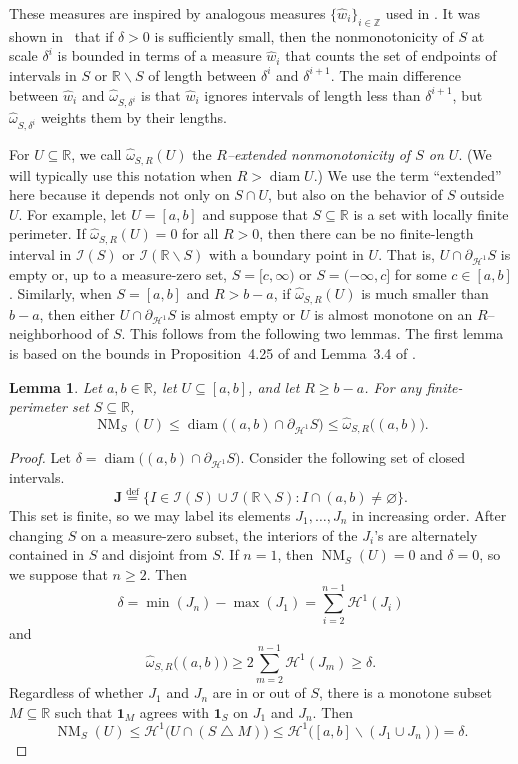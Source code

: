 \documentclass[11pt,reqno]{amsart}
\newcommand{\R}{\mathbb{R}}
\newcommand{\Z}{\mathbb{Z}}
\newcommand{\cH}{\mathcal{H}}
\newcommand{\cI}{\mathcal{I}}
\newcommand{\0}{\mathbf{0}}
\renewcommand{\1}{\mathbf 1}
\newcommand{\one}{\mathbf{1}}
\newcommand{\symdiff}{\mathbin{\triangle}}
\renewcommand{\mid}{:}
\renewcommand{\subset}{\subseteq}
\newcommand{\eqdef}{\stackrel{\mathrm{def}}{=}}
\renewcommand{\ge}{\geqslant}
\renewcommand{\le}{\leqslant}
\renewcommand{\setminus}{\smallsetminus}
\renewcommand{\emptyset}{\varnothing}
\newtheorem{lemma}[thm]{Lemma}
\theoremstyle{remark}
\newcommand{\bJ}{\mathbf{J}}
\DeclareMathOperator{\NM}{NM}
\DeclareMathOperator{\diam}{diam}
\begin{document}
These measures are inspired  by analogous measures $\{\widehat{w}_i\}_{i\in \Z}$ used in \cite{CKN}.  It was shown in~\cite{CKN} that if $\delta>0$ is sufficiently small, then the nonmonotonicity of $S$ at scale $\delta^i$ is bounded in terms of a measure $\widehat{w}_i$ that counts the set of endpoints of intervals in $S$ or $\R\setminus S$ of length between $\delta^i$ and $\delta^{i+1}$.  The main difference between $\widehat{w}_i$ and $\widehat{\omega}_{S,\delta^i}$ is that $\widehat{w}_i$ ignores intervals of length less than $\delta^{i+1}$, but $\widehat{\omega}_{S, \delta^i}$ weights them by their lengths.

For $U\subset \R$, we call $\widehat{\omega}_{S,R}(U)$ the \emph{$R$--extended nonmonotonicity of $S$ on $U$}.  (We will typically use this notation when $R>\diam U$.)  We use the term ``extended'' here because it depends not only on $S\cap U$, but also on the behavior of $S$ outside $U$.  For example, let $U=[a,b]$ and suppose that $S\subset \R$ is a set with locally finite perimeter.  If $\widehat{\omega}_{S,R}(U)=0$ for all $R>0$, then there can be no finite-length interval in $\cI(S)$ or $\cI(\R\setminus S)$ with a boundary point in $U$.  That is, $U\cap \partial_{\cH^1}S$ is empty or, up to a measure-zero set, $S=[c,\infty)$ or $S=(-\infty,c]$ for some $c\in [a,b]$. Similarly, when $S=[a,b]$ and $R > b-a$, if $\widehat{\omega}_{S ,R}(U)$ is much smaller than $b-a$, then either $U\cap \partial_{\cH^1} S$ is almost empty or $U$ is almost monotone on an $R$--neighborhood of $S$.  This follows from the following two lemmas.  The first lemma is based on the bounds in Proposition~4.25 of \cite{CKN} and Lemma~3.4 of \cite{FasslerOrponenRigot18}.
\begin{lemma}\label{lem:omega boundary diam NM}
  Let $a,b\in \R$, let $U \subset [a,b]$, and let $R\ge b-a$.  For any finite-perimeter set $S\subset \R$,
  $$\NM_{S}(U)\le \diam \big( (a,b)\cap \partial_{\cH^1} S\big) \le \widehat{\omega}_{S,R}\big((a,b)\big).$$
\end{lemma}
\begin{proof}
  Let $\delta=\diam \big( (a,b)\cap \partial_{\cH^1} S\big)$.  Consider the following set of closed intervals.
  $$\bJ\eqdef \{I\in \cI(S)\cup \cI(\R\setminus S)\mid I\cap (a,b)\ne \emptyset\}.$$
  This set is finite, so we may label its elements $J_1,\dots, J_n$ in increasing order.  After changing $S$ on a measure-zero subset, the interiors of the $J_i$'s are alternately contained in $S$ and disjoint from $S$.  If $n=1$, then $\NM_{S}(U)=0$ and $\delta=0$, so we suppose that $n\ge 2$.  Then
  $$\delta=\min(J_n)-\max(J_1)=\sum_{i=2}^{n-1} \cH^1(J_i)$$
  and
  $$\widehat{\omega}_{S,R}\big((a,b)\big)\ge 2 \sum_{m=2}^{n-1} \cH^1(J_m)\ge \delta.$$
Regardless of whether $J_1$ and $J_n$ are in or out of $S$, there is a monotone subset $M\subset \R$ such that $\one_M$ agrees with $\one_S$ on $J_1$ and $J_n$.  Then
 \begin{equation*}
 \NM_{S}(U)\le \cH^1\big(U\cap (S\symdiff M)\big) \le \cH^1\big([a,b]\setminus (J_1\cup J_n)\big) = \delta.\tag*{\qedhere}
 \end{equation*}
\end{proof}
\end{document}
